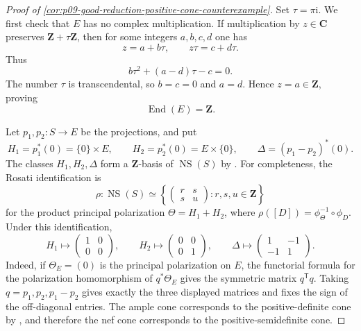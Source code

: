 \begin{proof}[Proof of
\cref{cor:p09-good-reduction-positive-cone-counterexample}]
Set \(\tau=\pi\mathrm i\).  We first check that \(E\) has no complex
multiplication.  If multiplication by \(z\in\mathbf C\) preserves
\(\mathbf Z+\tau\mathbf Z\), then for some integers \(a,b,c,d\) one has
\[
                              z=a+b\tau,
 \qquad
                              z\tau=c+d\tau.
\]
Thus
\[
                       b\tau^2+(a-d)\tau-c=0.
\]
The number \(\tau\) is transcendental, so \(b=c=0\) and \(a=d\).  Hence
\(z=a\in\mathbf Z\), proving
\[
                              \operatorname{End}(E)=\mathbf Z.
\]

Let \(p_1,p_2:S\to E\) be the projections, and put
\[
 H_1=p_1^*(0)=\{0\}\times E,
 \qquad
 H_2=p_2^*(0)=E\times\{0\},
 \qquad
 \Delta=(p_1-p_2)^*(0).
\]
The classes \(H_1,H_2,\Delta\) form a \(\mathbf Z\)-basis of
\(\operatorname{NS}(S)\) by
\cite[Remark~3.4]{BauerBorntraeger18}.  For completeness, the Rosati
identification is
\[
\rho:\operatorname{NS}(S)\simeq
 \left\{
   \begin{pmatrix}r&s\\s&u\end{pmatrix}:r,s,u\in\mathbf Z
 \right\}
\]
for the product principal polarization \(\Theta=H_1+H_2\), where
\(\rho([D])=\phi_\Theta^{-1}\circ\phi_D\).  Under this identification,
\[
 H_1\longmapsto
 \begin{pmatrix}1&0\\0&0\end{pmatrix},
 \qquad
 H_2\longmapsto
 \begin{pmatrix}0&0\\0&1\end{pmatrix},
 \qquad
 \Delta\longmapsto
 \begin{pmatrix}1&-1\\-1&1\end{pmatrix}.
\]
Indeed, if \(\Theta_E=(0)\) is the principal polarization on \(E\), the
functorial formula for the polarization homomorphism of \(q^*\Theta_E\)
gives the symmetric matrix \(q^{\mathsf T}q\).  Taking
\(q=p_1,p_2,p_1-p_2\) gives exactly the three displayed matrices and fixes
the sign of the off-diagonal entries.
The ample cone corresponds to the positive-definite cone by
\cite[Theorem~4.3]{PrendergastSmith12}, and therefore the nef cone
corresponds to the positive-semidefinite cone.


\end{proof}
